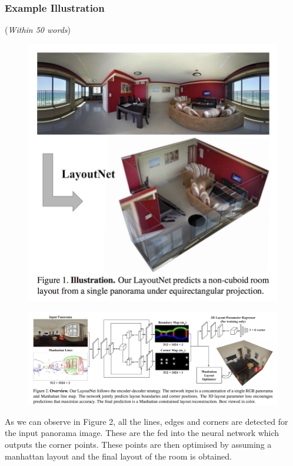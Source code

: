 \documentclass[11pt]{article}
\begin{document}
\subsubsection{Example Illustration}
({\em Within 50 words}) \\

\begin{figure}
	\centering
	\includegraphics[width=\textwidth/2]{WPL/LON1.png}
\end{figure}
\begin{figure}
	\centering
	\includegraphics[width=\textwidth]{WPL/LON2.png}
\end{figure}

As we can observe in Figure 2, all the lines, edges and corners are detected for the input panorama image. These are the fed into the neural network which outputs the corner points. These points are then optimised by assuming a manhattan layout and the final layout of the room is obtained.
\end{document}
